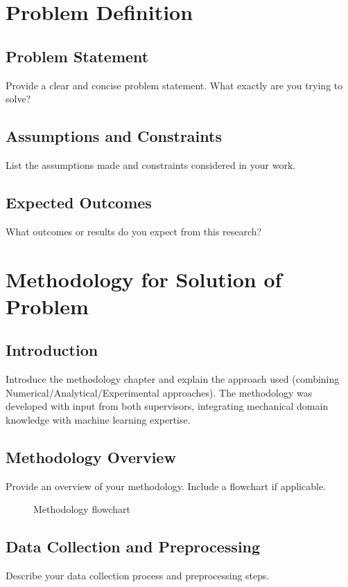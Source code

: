 \documentclass[12pt,a4paper]{report}
\begin{document}
\chapter{Problem Definition}
\label{ch:problem}

\section{Problem Statement}
Provide a clear and concise problem statement.
What exactly are you trying to solve?

\section{Assumptions and Constraints}
List the assumptions made and constraints considered in your work.

\section{Expected Outcomes}
What outcomes or results do you expect from this research?

\chapter{Methodology for Solution of Problem}
\label{ch:methodology}

\section{Introduction}
Introduce the methodology chapter and explain the approach used (combining Numerical/Analytical/Experimental approaches).
The methodology was developed with input from both supervisors, integrating mechanical domain knowledge with machine learning expertise.

\section{Methodology Overview}
Provide an overview of your methodology. Include a flowchart if applicable.
\begin{figure}[h]
\centering
\caption{Methodology flowchart}
\label{fig:methodology}
\end{figure}

\section{Data Collection and Preprocessing}
Describe your data collection process and preprocessing steps.
\end{document}
